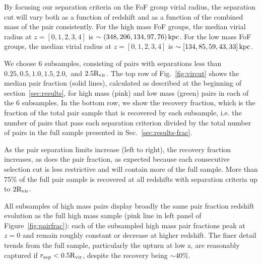 \documentclass[twocolumn]{aastex631}
\newcommand{\Rvir}{\ensuremath{\rm R_{vir}}}
\begin{document}
    By focusing our separation criteria on the FoF group virial radius, the separation cut will vary both as a function of redshift and as a function of the combined mass of the pair consistently.
    For the high mass FoF groups, the median virial radius at $z=[0,1,2,3,4]$ is $\sim(348, 206, 134, 97, 76)\mathrm{\,kpc}$. 
    For the low mass FoF groups, the median virial radius at $z=[0,1,2,3,4]$ is $\sim[134, 85, 59, 43, 33]\mathrm{\,kpc}$.    
    
    We choose 6 subsamples, consisting of pairs with separations less than $0.25, 0.5, 1.0, 1.5, 2.0,$ and $2.5\Rvir$. 
    The top row of Fig.~\ref{fig:vircut} shows the median pair fraction (solid lines), calculated as described at the beginning of section~\ref{sec:results}, 
    for high mass (pink) and low mass (green) pairs in each of the 6 subsamples. 
    In the bottom row, we show the recovery fraction, which is the fraction of the total pair sample that is recovered by each subsample, i.e. the number of pairs that pass each separation criterion divided by the total number of pairs in the full sample presented in Sec.~\ref{sec:results-frac}.

    As the pair separation limits increase (left to right), the recovery fraction increases, as does the pair fraction, as expected because each consecutive selection cut is less restrictive and will contain more of the full sample. 
    More than 75\% of the full pair sample is recovered at all redshifts with separation criteria up to $2\Rvir$.

    All subsamples of high mass pairs display broadly the same pair fraction redshift evolution as the full high mass sample (pink line in left panel of Figure~\ref{fig:pairfrac}): each of the subsampled high mass pair fractions peak at $z=0$ and remain roughly constant or decrease at higher redshift. 
    The finer detail trends from the full sample, particularly the upturn at low z, are reasonably captured if $r_{\mathrm{sep}} < 0.5 \Rvir$, despite the recovery being $\sim$40\%. 
\end{document}
